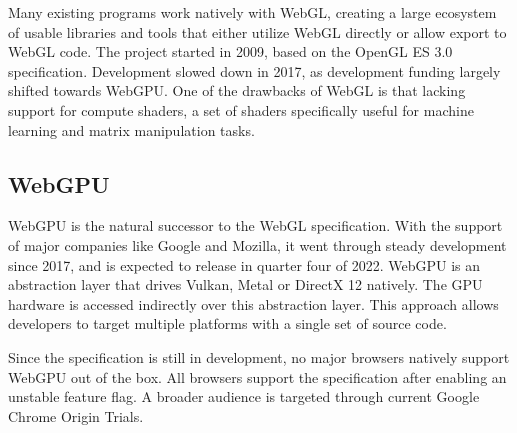 Many existing programs work natively with WebGL, creating a large ecosystem of usable libraries
and tools that either utilize WebGL directly or allow export to WebGL code.
The project started in 2009, based on the OpenGL ES 3.0 specification.
Development slowed down in 2017, as development funding largely shifted towards WebGPU.
One of the drawbacks of WebGL is that lacking support for compute shaders, a set of shaders
specifically useful for machine learning and matrix manipulation tasks.

\subsection{WebGPU}
WebGPU is the natural successor to the WebGL specification.
With the support of major companies like Google and Mozilla, it went through steady
development since 2017, and is expected to release in quarter four of 2022.
WebGPU is an abstraction layer that drives Vulkan, Metal or DirectX 12 natively.
The GPU hardware is accessed indirectly over this abstraction layer.
This approach allows developers to target multiple platforms with a single set of source code.

Since the specification is still in development, no major browsers natively support WebGPU
out of the box. All browsers support the specification after enabling an unstable feature flag.
A broader audience is targeted through current Google Chrome Origin Trials.

